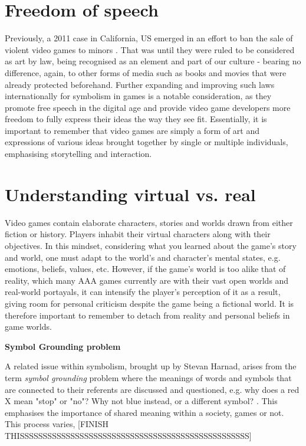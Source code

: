 \documentclass{scrartcl}
\begin{document}
\section{Freedom of speech}
Previously, a 2011 case in California, US emerged in an effort to ban the sale of violent video games to minors \cite{brownv}. That was until they were ruled to be considered as art by law, being recognised as an element and part of our culture - bearing no difference, again, to other forms of media such as books and movies that were already protected beforehand. Further expanding and improving such laws internationally for symbolism in games is a notable consideration, as they promote free speech in the digital age and provide video game developers more freedom to fully express their ideas the way they see fit. Essentially, it is important to remember that video games are simply a form of art and expressions of various ideas brought together by single or multiple individuals, emphasising storytelling and interaction.

\section{Understanding virtual vs. real}
Video games contain elaborate characters, stories and worlds drawn from either fiction or history. Players inhabit their virtual characters along with their objectives. In this mindset, considering what you learned about the game's story and world, one must adapt to the world's and character's mental states, e.g. emotions, beliefs, values, etc. However, if the game's world is too alike that of reality, which many AAA games currently are with their vast open worlds and real-world portayals, it can intensify the player's perception of it as a result, giving room for personal criticism despite the game being a fictional world. It is therefore important to remember to detach from reality and personal beliefs in game worlds.


\hspace{-4mm}\textbf{Symbol Grounding problem}

\hspace{-6mm}
A related issue within symbolism, brought up by Stevan Harnad, arises from the term \textit{symbol grounding} problem where the meanings of words and symbols that are connected to their referents are discussed and questioned, e.g. why does a red X mean "stop" or "no"? Why not blue instead, or a different symbol? \cite{harnad} \cite{davidmyers}. This emphasises the importance of shared meaning within a society, games or not. \cite{simon} This process varies, [FINISH THISSSSSSSSSSSSSSSSSSSSSSSSSSSSSSSSSSSSSSSSSSSSSSSSSS]
\end{document}
